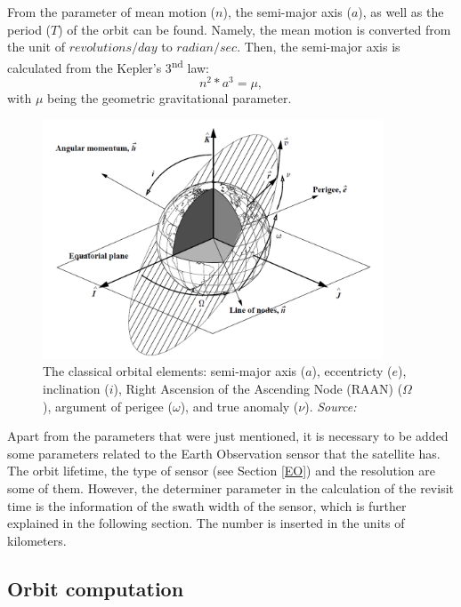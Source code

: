 From the parameter of mean motion ($n$), the semi-major axis ($a$), as well as the period ($T$) of the orbit can be found. Namely, the mean motion is converted from the unit of $revolutions/day$ to $radian/sec$. Then, the semi-major axis is calculated from the Kepler's 3\textsuperscript{nd} law:
\begin{equation}
n^2 * a^3 = \mu,
\end{equation}
with $\mu$ being the geometric gravitational parameter.

\begin{figure}
\centering
\includegraphics[width=0.9\textwidth]{Images/keplerian_elements.png}\caption{The classical orbital elements: semi-major axis ($a$), eccentricty ($e$), inclination ($i$), Right Ascension of the Ascending Node (RAAN) ($\Omega$), argument of perigee ($\omega$), and true anomaly ($\nu$). \textit{Source: \cite{Vallado}}}
\label{keplerian_elements} 
\end{figure}

Apart from the parameters that were just mentioned, it is necessary to be added some parameters related to the Earth Observation sensor that the satellite has. The orbit lifetime, the type of sensor (see Section \ref{EO}) and the resolution are some of them. However, the determiner parameter in the calculation of the revisit time is the information of the swath width of the sensor, which is further explained in the following section. The number is inserted in the units of kilometers.

\bigskip
\subsection{Orbit computation}
\bigskip


